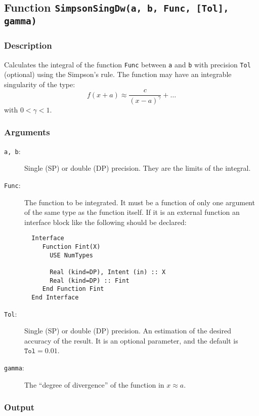 \subsection{Function \texttt{SimpsonSingDw(a, b, Func, [Tol], gamma)}}

\subsubsection{Description}

Calculates the integral of the function \texttt{Func} between
\texttt{a} and \texttt{b} with precision \texttt{Tol} (optional) using
the Simpson's rule. The function may have an integrable singularity of
the type:
\begin{displaymath}
  f(x+a) \approx \frac{c}{(x-a)^\gamma} +  \dots
\end{displaymath}
with $0<\gamma<1$.

\subsubsection{Arguments}

\begin{description}
\item[\texttt{a, b}:] Single (SP) or double (DP) precision. They are
  the limits of the integral.
\item[\texttt{Func}:] The function to be integrated. It must be a
  function of only one argument of the same type as the function
  itself. If it is an
  external function an interface block like the following should be
  declared: 
\begin{verbatim}
  Interface 
     Function Fint(X)
       USE NumTypes

       Real (kind=DP), Intent (in) :: X
       Real (kind=DP) :: Fint
     End Function Fint
  End Interface
\end{verbatim}
\item[\texttt{Tol}:] Single (SP) or double (DP) precision. An
  estimation of the desired accuracy of the result. It is an optional
  parameter, and the default is $\mathtt{Tol} = 0.01$. 
\item[\texttt{gamma}:] The ``degree of divergence'' of the function in
  $x\approx a$. 
\end{description}


\subsubsection{Output}

